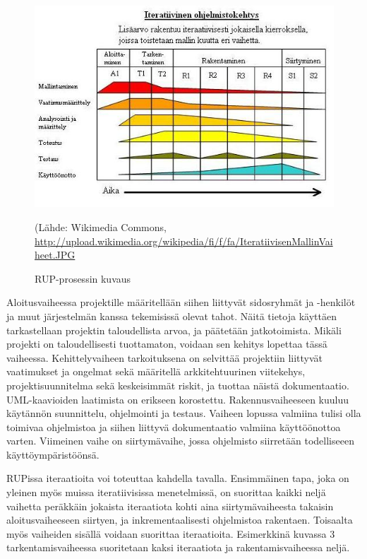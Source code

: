 \documentclass[finnish,12pt]{tktltiki2}
\theoremstyle{definition}
\theoremstyle{remark}
\begin{document}
\begin{figure}[ht!]
\centering
{}
\includegraphics[width=150mm]{RUP.jpg}
\caption{RUP-prosessin kuvaus}
(Lähde: Wikimedia Commons, \url{http://upload.wikimedia.org/wikipedia/fi/f/fa/IteratiivisenMallinVaiheet.JPG}
\label{overflow}
\end{figure}
\pagebreak
Aloitusvaiheessa projektille määritellään siihen liittyvät sidosryhmät ja -henkilöt ja muut järjestelmän kanssa tekemisissä olevat tahot. Näitä tietoja käyttäen tarkastellaan projektin taloudellista arvoa, ja päätetään jatkotoimista. Mikäli projekti on taloudellisesti tuottamaton, voidaan sen kehitys lopettaa tässä vaiheessa. 
Kehittelyvaiheen tarkoituksena on selvittää projektiin liittyvät vaatimukset ja ongelmat sekä määritellä arkkitehtuurinen viitekehys, projektisuunnitelma sekä keskeisimmät riskit, ja tuottaa näistä dokumentaatio. UML-kaavioiden laatimista on erikseen korostettu.
Rakennusvaiheeseen kuuluu käytännön suunnittelu, ohjelmointi ja testaus. Vaiheen lopussa valmiina tulisi olla toimivaa ohjelmistoa ja siihen liittyvä dokumentaatio valmiina käyttöönottoa varten.
Viimeinen vaihe on siirtymävaihe, jossa ohjelmisto siirretään todelliseeen käyttöympäristöönsä.

RUPissa iteraatioita voi toteuttaa kahdella tavalla. Ensimmäinen tapa, joka on yleinen myös muissa iteratiivisissa menetelmissä, on suorittaa kaikki neljä vaihetta peräkkäin jokaista iteraatiota kohti aina siirtymävaiheesta takaisin aloitusvaiheeseen siirtyen, ja inkrementaalisesti ohjelmistoa rakentaen. Toisaalta myös vaiheiden sisällä voidaan suorittaa iteraatioita. Esimerkkinä kuvassa 3 tarkentamisvaiheessa suoritetaan kaksi iteraatiota ja rakentamisvaiheessa neljä.
\end{document}
